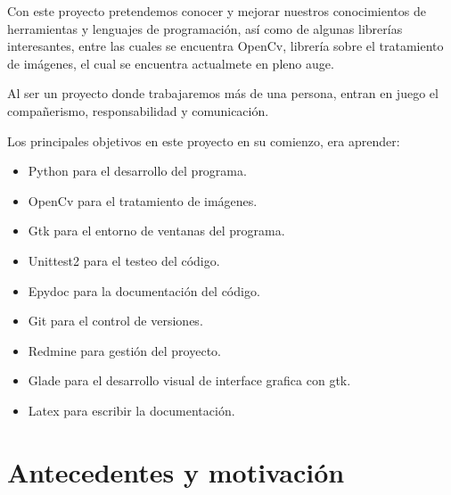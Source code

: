 \documentclass[12pt,a4paper]{report}
\begin{document}


Con este proyecto pretendemos conocer y mejorar nuestros conocimientos de 
herramientas y lenguajes de programación, así como de algunas librerías
interesantes, entre las cuales se encuentra OpenCv, librería sobre el
tratamiento de imágenes, el cual se encuentra actualmete en pleno auge. 

Al ser un proyecto donde trabajaremos más de una persona, entran en juego el
compañerismo, responsabilidad y comunicación. 

Los principales objetivos en este proyecto en su comienzo, era aprender:
\begin{itemize} 
    \item Python para el desarrollo del programa. 
    \item OpenCv para el tratamiento de imágenes. 
    \item Gtk para el entorno de ventanas del programa. 
    \item Unittest2 para el testeo del código. 
    \item Epydoc para la documentación del código. 
    \item Git para el control de versiones. 
    \item Redmine para gestión del proyecto. 
    \item Glade para el desarrollo visual de interface grafica con gtk.
    \item Latex para escribir la documentación. 
\end{itemize}


\chapter{Antecedentes y motivación}
\end{document}
